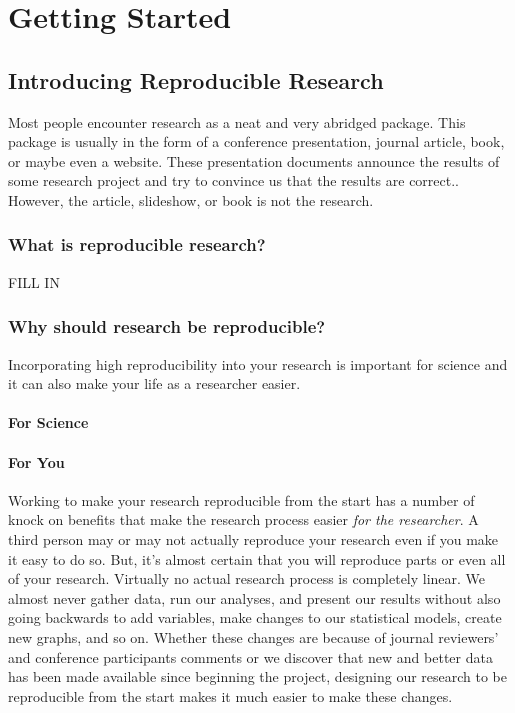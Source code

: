 \documentclass[ChapterTOCs,krantz1]{krantz}\usepackage{graphicx, color}
\begin{document}
\part{Getting Started}





\chapter{Introducing Reproducible Research}\label{Intro}

Most people encounter research as a neat and very abridged package. This package is usually in the form of a conference presentation, journal article, book, or maybe even a website. These presentation documents announce the results of some research project and try to convince us that the results are correct.\cite{Mesirov2010}. However, the article, slideshow, or book is not the research. 
\section{What is reproducible research?}

FILL IN

\section{Why should research be reproducible?}

Incorporating high reproducibility into your research is important for science and it can also make your life as a researcher easier. 

\subsection{For Science}

\subsection{For You}

Working to make your research reproducible from the start has a number of knock on benefits that make the research process easier {\emph{for the researcher}}. A third person may or may not actually reproduce your research even if you make it easy to do so. But, it's almost certain that you will reproduce parts or even all of your research. Virtually no actual research process is completely linear. We almost never gather data, run our analyses, and present our results without also going backwards to add variables, make changes to our statistical models, create new graphs, and so on. Whether these changes are because of journal reviewers' and conference participants comments or we discover that new and better data has been made available since beginning the project, designing our research to be reproducible from the start makes it much easier to make these changes. 
\end{document}
